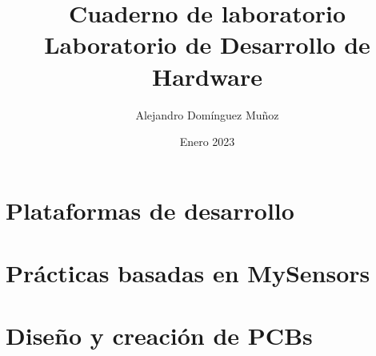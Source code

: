 \documentclass[12pt]{book}
\title{
    {Cuaderno de laboratorio}\\
    {\normalsize Laboratorio de Desarrollo de Hardware}
}
\author{Alejandro Domínguez Muñoz}
\date{Enero 2023}
\begin{document}
\maketitle

\tableofcontents

\part{Plataformas de desarrollo}



\part{Prácticas basadas en MySensors}



\part{Diseño y creación de PCBs}


\end{document}
